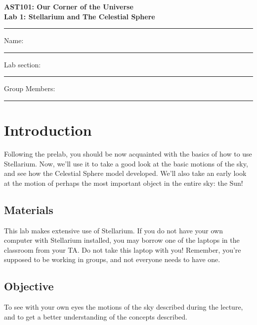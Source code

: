 \documentclass[11pt]{article}
\begin{document}
	\begin{center}
		\textbf{\Large
			AST101: Our Corner of the Universe \\
			\vspace*{0.1cm}
			Lab 1: Stellarium and The Celestial Sphere
		}
	\end{center}
	
	\vspace*{0.5cm}
	
	\hrule
	{\Large Name:}\vspace*{0.5cm}\\\hrule
	{\Large Lab section:}\vspace*{0.5cm}\\\hrule
	{\Large Group Members:}\vspace*{0.5cm}\\\hrule
	\vspace*{0.5cm}
	
	\section{Introduction}
	
	Following the prelab, you should be now acquainted with the basics of how to use Stellarium. Now, we'll use it to take a good look at the basic motions of the sky, and see how the Celestial Sphere model developed. We'll also take an early look at the motion of perhaps the most important object in the entire sky: the Sun!
	
	\subsection*{Materials}
	
	This lab makes extensive use of Stellarium. If you do not have your own computer with Stellarium installed, you may borrow one of the laptops in the classroom from your TA. Do not take this laptop with you! Remember, you're supposed to be working in groups, and not everyone needs to have one.
	
	\subsection*{Objective}
	
	To see with your own eyes the motions of the sky described during the lecture, and to get a better understanding of the concepts described.
	
\end{document}
